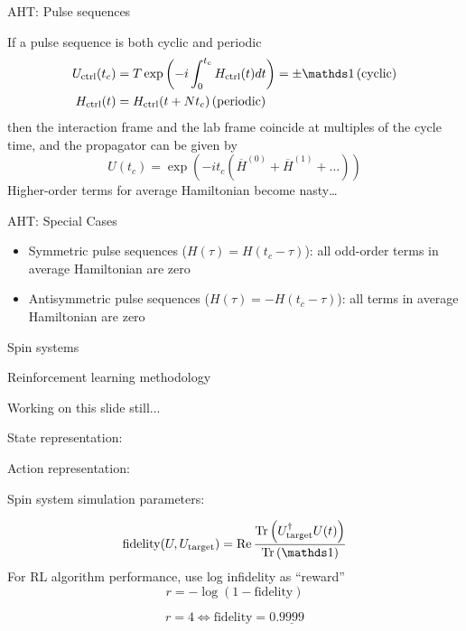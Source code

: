 \documentclass{beamer}
\begin{document}
\begin{frame}{AHT: Pulse sequences}


If a pulse sequence is both cyclic and periodic \cite{gerstein-dybowski}
\begin{align*}
    U_{\text{ctrl}}(t_c) &= T\exp \left(
        -i \int_0^{t_c} H_{\text{ctrl}}(t) dt \right) = \pm \identity
         \, \text{(cyclic)} \\
    H_{\text{ctrl}}(t) &= H_{\text{ctrl}}(t + Nt_c) \, \text{(periodic)}
\end{align*}
then the interaction frame and the lab frame coincide at multiples of
the cycle time, and the propagator can be given by
\[
    U(t_c) = \exp\left( -i t_c (\overline{H}^{(0)} +
        \overline{H}^{(1)} + \dots) \right)
\]
Higher-order terms for average Hamiltonian become nasty\dots

\end{frame}

\begin{frame}{AHT: Special Cases}

\begin{itemize}

\item
  Symmetric pulse sequences (\(H(\tau) = H(t_c - \tau)\)): all odd-order
  terms in average Hamiltonian are zero
\item
  Antisymmetric pulse sequences (\(H(\tau) = - H(t_c - \tau)\)): all
  terms in average Hamiltonian are zero
\end{itemize}
\end{frame}

\begin{frame}{Spin systems}


\end{frame}

\begin{frame}{Reinforcement learning methodology}


Working on this slide still...

State representation:

Action representation:

Spin system simulation parameters:


\[
    \text{fidelity}(U, U_\text{target}) = \Re{
        \frac{\Tr{U_\text{target}^\dagger U(t)}}{\Tr{\identity}}
    }
\]
For RL algorithm performance, use log infidelity as ``reward''
\[
    r = -\log \left( 1 - \text{fidelity} \right)
\]

\[
r = 4 \iff \text{fidelity} = 0.\underline{9999}
\]


\end{frame}
\end{document}
